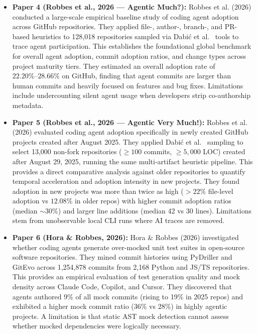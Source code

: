 \documentclass[11pt,a4paper]{article}
\begin{document}
\begin{itemize}[leftmargin=1.5em, itemsep=8pt]
    \item \textbf{Paper 4 (Robbes et al., 2026 --- Agentic Much?):}
    Robbes et al. (2026) conducted a large-scale empirical baseline study of coding agent adoption across GitHub repositories. They applied file-, author-, branch-, and PR-based heuristics to 128,018 repositories sampled via Dabi\'{c} et al.~\cite{dabic2021sampling} tools to trace agent participation. This establishes the foundational global benchmark for overall agent adoption, commit adoption ratios, and change types across project maturity tiers. They estimated an overall adoption rate of $22.20\%\text{--}28.66\%$ on GitHub, finding that agent commits are larger than human commits and heavily focused on features and bug fixes. Limitations include undercounting silent agent usage when developers strip co-authorship metadata.

    \item \textbf{Paper 5 (Robbes et al., 2026 --- Agentic Very Much!):}
    Robbes et al. (2026) evaluated coding agent adoption specifically in newly created GitHub projects created after August 2025. They applied Dabi\'{c} et al.~\cite{dabic2021sampling} sampling to select 13,000 non-fork repositories ($\ge 100$ commits, $\ge 5,000$ LOC) created after August 29, 2025, running the same multi-artifact heuristic pipeline. This provides a direct comparative analysis against older repositories to quantify temporal acceleration and adoption intensity in new projects. They found adoption in new projects was more than twice as high ($>22\%$ file-level adoption vs $12.08\%$ in older repos) with higher commit adoption ratios (median $\sim 30\%$) and larger line additions (median 42 vs 30 lines). Limitations stem from unobservable local CLI runs where AI traces are removed.

    \item \textbf{Paper 6 (Hora \& Robbes, 2026):}
    Hora \& Robbes (2026) investigated whether coding agents generate over-mocked unit test suites in open-source software repositories. They mined commit histories using PyDriller and GitEvo across 1,254,878 commits from 2,168 Python and JS/TS repositories. This provides an empirical evaluation of test generation quality and mock density across Claude Code, Copilot, and Cursor. They discovered that agents authored 9\% of all mock commits (rising to 19\% in 2025 repos) and exhibited a higher mock commit ratio (36\% vs 28\%) in highly agentic projects. A limitation is that static AST mock detection cannot assess whether mocked dependencies were logically necessary.


\end{itemize}
\end{document}
